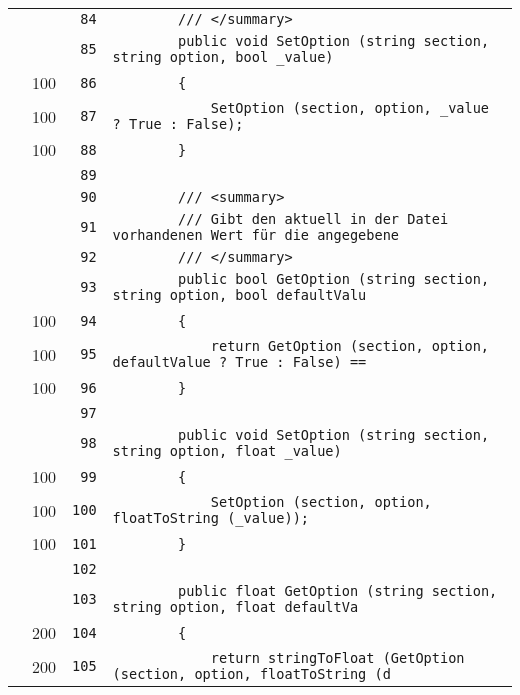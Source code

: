 \documentclass[a4paper,10pt]{article}
\begin{document}
\begin{longtable}[l]{lrrl}
\cellcolor{gray} &  & \verb~84~ & \verb~        /// </summary>~\\
\cellcolor{gray} &  & \verb~85~ & \verb~        public void SetOption (string section, string option, bool _value)~\\
\cellcolor{green} & 100 & \verb~86~ & \verb~        {~\\
\cellcolor{green} & 100 & \verb~87~ & \verb~            SetOption (section, option, _value ? True : False);~\\
\cellcolor{green} & 100 & \verb~88~ & \verb~        }~\\
\cellcolor{gray} &  & \verb~89~ & \verb~~\\
\cellcolor{gray} &  & \verb~90~ & \verb~        /// <summary>~\\
\cellcolor{gray} &  & \verb~91~ & \verb~        /// Gibt den aktuell in der Datei vorhandenen Wert für die angegebene ~\\
\cellcolor{gray} &  & \verb~92~ & \verb~        /// </summary>~\\
\cellcolor{gray} &  & \verb~93~ & \verb~        public bool GetOption (string section, string option, bool defaultValu~\\
\cellcolor{green} & 100 & \verb~94~ & \verb~        {~\\
\cellcolor{green} & 100 & \verb~95~ & \verb~            return GetOption (section, option, defaultValue ? True : False) ==~\\
\cellcolor{green} & 100 & \verb~96~ & \verb~        }~\\
\cellcolor{gray} &  & \verb~97~ & \verb~~\\
\cellcolor{gray} &  & \verb~98~ & \verb~        public void SetOption (string section, string option, float _value)~\\
\cellcolor{green} & 100 & \verb~99~ & \verb~        {~\\
\cellcolor{green} & 100 & \verb~100~ & \verb~            SetOption (section, option, floatToString (_value));~\\
\cellcolor{green} & 100 & \verb~101~ & \verb~        }~\\
\cellcolor{gray} &  & \verb~102~ & \verb~~\\
\cellcolor{gray} &  & \verb~103~ & \verb~        public float GetOption (string section, string option, float defaultVa~\\
\cellcolor{green} & 200 & \verb~104~ & \verb~        {~\\
\cellcolor{green} & 200 & \verb~105~ & \verb~            return stringToFloat (GetOption (section, option, floatToString (d~\\

\end{longtable}
\end{document}
